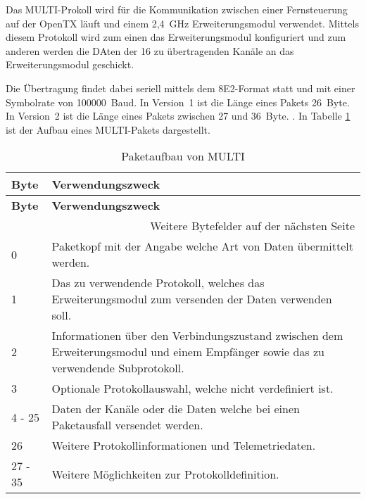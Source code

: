 Das MULTI-Prokoll wird für die Kommunikation zwischen einer Fernsteuerung auf der OpenTX läuft und einem 2,4~GHz Erweiterungsmodul verwendet. Mittels diesem Protokoll wird zum einen das Erweiterungsmodul konfiguriert und zum anderen werden die DAten der 16 zu übertragenden Kanäle an das Erweiterungsmodul geschickt. \cites{langerTransmitter}{langerMultiprotocol}

Die Übertragung findet dabei seriell mittels dem 8E2-Format statt und mit einer Symbolrate von 100000~Baud. In Version~1 ist die Länge eines Pakets 26~Byte. In Version~2 ist die Länge eines Pakets zwischen 27 und 36~Byte. \cite{langerMultiprotocol}. In Tabelle \ref{table:mutliPaket} ist der Aufbau eines MULTI-Pakets dargestellt.

\begin{longtable}[c]{|p{2cm}|p{13cm}|}
    \caption{Paketaufbau von MULTI \cite{langerMultiprotocol}}
    \label{table:mutliPaket}\\
    \hline
    \textbf{Byte} & \textbf{Verwendungszweck}\\
    \hline
    \hline
    \endfirsthead

    \hline
    \textbf{Byte} & \textbf{Verwendungszweck}\\
    \hline
    \hline
    \endhead

    \hline
    \multicolumn{2}{|r|}{Weitere Bytefelder auf der nächsten Seite}\\
    \hline
    \endfoot

    \hline
    \endlastfoot
    
    0 & Paketkopf mit der Angabe welche Art von Daten übermittelt werden. \\
    \hline
    1 & Das zu verwendende Protokoll, welches das Erweiterungsmodul zum versenden der Daten verwenden soll. \\
    \hline
    2 & Informationen über den Verbindungszustand zwischen dem Erweiterungsmodul und einem Empfänger sowie das zu verwendende Subprotokoll. \\
    \hline
    3 & Optionale Protokollauswahl, welche nicht verdefiniert ist. \\
    \hline
    4 - 25 & Daten der Kanäle oder die Daten welche bei einen Paketausfall versendet werden. \\
    \hline
    26 & Weitere Protokollinformationen und Telemetriedaten. \\
    \hline
    27 - 35 & Weitere Möglichkeiten zur Protokolldefinition. \\
\end{longtable}

